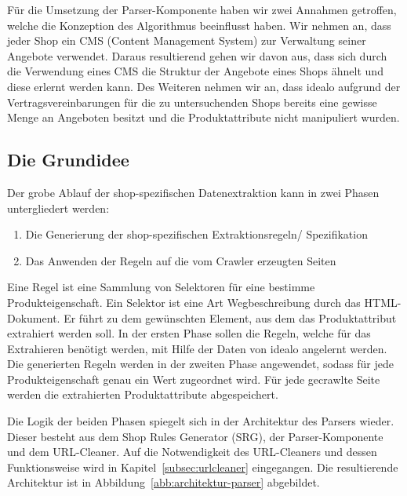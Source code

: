 Für die Umsetzung der Parser-Komponente haben wir zwei Annahmen getroffen, welche die Konzeption des Algorithmus
beeinflusst haben.
Wir nehmen an, dass jeder Shop ein CMS (Content Management System) zur Verwaltung seiner Angebote verwendet.
Daraus resultierend gehen wir davon aus, dass sich durch die Verwendung eines CMS die Struktur der Angebote eines Shops
ähnelt und diese erlernt werden kann.
Des Weiteren nehmen wir an, dass idealo aufgrund der Vertragsvereinbarungen für die zu untersuchenden Shops bereits
eine gewisse Menge an Angeboten besitzt und die Produktattribute nicht manipuliert wurden.

\subsection{Die Grundidee}
\label{subsec:grundidee}

Der grobe Ablauf der shop-spezifischen Datenextraktion kann in zwei Phasen untergliedert werden:
\begin{enumerate}
    \item Die Generierung der shop-spezifischen Extraktionsregeln/ Spezifikation
    \item Das Anwenden der Regeln auf die vom Crawler erzeugten Seiten
\end{enumerate}
Eine Regel ist eine Sammlung von Selektoren für eine bestimme Produkteigenschaft.
Ein Selektor ist eine Art Wegbeschreibung durch das HTML-Dokument.
Er führt zu dem gewünschten Element, aus dem das Produktattribut extrahiert werden soll.
In der ersten Phase sollen die Regeln, welche für das Extrahieren benötigt werden, mit Hilfe der Daten von idealo
angelernt werden.
Die generierten Regeln werden in der zweiten Phase angewendet, sodass für jede Produkteigenschaft genau ein Wert
zugeordnet wird.
Für jede gecrawlte Seite werden die extrahierten Produktattribute abgespeichert.

Die Logik der beiden Phasen spiegelt sich in der Architektur des Parsers wieder.
Dieser besteht aus dem Shop Rules Generator (SRG), der Parser-Komponente und dem URL-Cleaner.
Auf die Notwendigkeit des URL-Cleaners und dessen Funktionsweise wird in Kapitel~\ref{subsec:urlcleaner} eingegangen.
Die resultierende Architektur ist in Abbildung~\ref{abb:architektur-parser} abgebildet.

